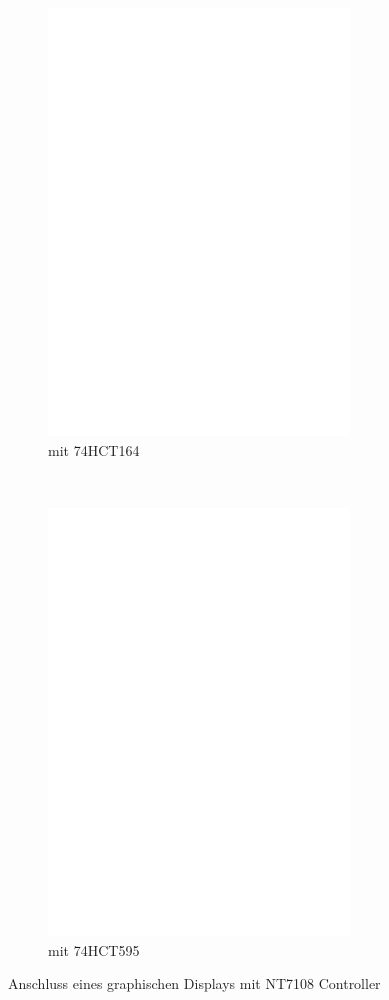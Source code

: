 \begin{figure}[H]
  \begin{subfigure}[b]{9cm}
    \centering
    \includegraphics[width=8cm]{../FIG/ST7108serial164.eps}
    \caption{mit 74HCT164}
  \end{subfigure}
  ~
  \begin{subfigure}[b]{9cm}
    \centering
    \includegraphics[width=8cm]{../FIG/ST7108serial595.eps}
    \caption{mit 74HCT595}
  \end{subfigure}
  \caption{Anschluss eines graphischen Displays mit NT7108 Controller}
  \label{fig:NT7108lcd}
\end{figure}

